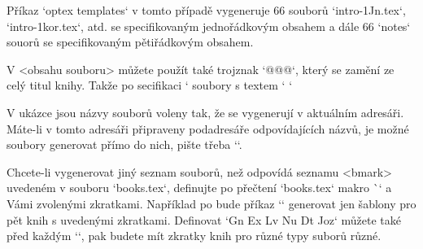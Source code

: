 \endfile


\endfile
\endtt
%
Příkaz `optex templates` v tomto případě vygeneruje 66 souborů
`intro-1Jn.tex`, `intro-1kor.tex`, atd. se specifikovaným jednořádkovým
obsahem a dále 66 `notes` souorů se specifikovaným pětiřádkovým obsahem.

V <obsahu souboru> můžete použít také trojznak `@@@`, který se zamění ze
celý titul knihy. Takže po secifikaci `%
soubory s textem `%
`%

V ukázce jsou názvy souborů voleny tak, že se vygenerují v aktuálním
adresáři. Máte-li v tomto adresáři připraveny podadresáře odpovídajících
názvů, je možné soubory generovat přímo do nich, pište třeba
``.

Chcete-li vygenerovat jiný seznam souborů, než odpovídá seznamu <bmark>
uvedeném v souboru `books.tex`, definujte po přečtení `books.tex`
makro \`\genbooks` a Vámi zvolenými zkratkami. Například po
\begtt
\def\genbooks {Gn Ex Lv Nu Dt Joz}
\endtt
%
bude příkaz `\filegen` generovat jen šablony pro pět knih s uvedenými
zkratkami. Definovat `\genbooks` můžete také před každým `\filegen`, pak
budete mít zkratky knih pro různé typy suborů různé.


